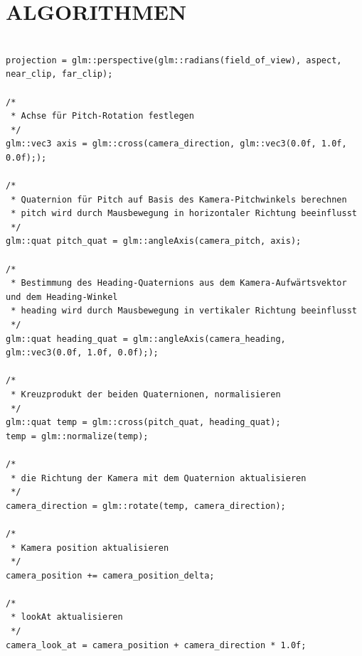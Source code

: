 	
	\section{\Large ALGORITHMEN}
	
\begin{lstlisting}

projection = glm::perspective(glm::radians(field_of_view), aspect, near_clip, far_clip);

/*
 * Achse für Pitch-Rotation festlegen
 */
glm::vec3 axis = glm::cross(camera_direction, glm::vec3(0.0f, 1.0f, 0.0f););

/*
 * Quaternion für Pitch auf Basis des Kamera-Pitchwinkels berechnen
 * pitch wird durch Mausbewegung in horizontaler Richtung beeinflusst
 */
glm::quat pitch_quat = glm::angleAxis(camera_pitch, axis);

/*
 * Bestimmung des Heading-Quaternions aus dem Kamera-Aufwärtsvektor und dem Heading-Winkel
 * heading wird durch Mausbewegung in vertikaler Richtung beeinflusst
 */
glm::quat heading_quat = glm::angleAxis(camera_heading, glm::vec3(0.0f, 1.0f, 0.0f););

/*
 * Kreuzprodukt der beiden Quaternionen, normalisieren
 */
glm::quat temp = glm::cross(pitch_quat, heading_quat);
temp = glm::normalize(temp);

/*
 * die Richtung der Kamera mit dem Quaternion aktualisieren
 */
camera_direction = glm::rotate(temp, camera_direction);

/*
 * Kamera position aktualisieren
 */
camera_position += camera_position_delta;

/*
 * lookAt aktualisieren
 */
camera_look_at = camera_position + camera_direction * 1.0f;



\end{lstlisting}
	
	
	
	
	
